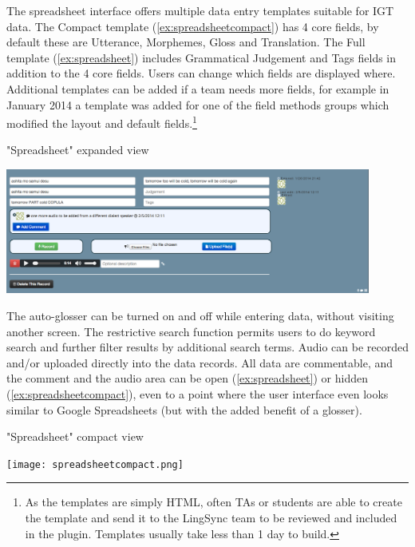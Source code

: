 \documentclass[letterpaper, 12pt, dvips]{mitwpl}
\begin{document}
 The spreadsheet interface offers multiple data entry templates suitable for IGT data. The Compact template (\ref{ex:spreadsheetcompact}) has 4 core fields, by default these are Utterance, Morphemes, Gloss and Translation. The Full template  (\ref{ex:spreadsheet}) includes Grammatical Judgement and Tags fields in addition to the 4 core fields. Users can change which fields are displayed where. Additional templates can be added if a team needs more fields, for example in January 2014 a template was added for one of the field methods groups which modified the layout and default fields.\footnote{As the templates are simply HTML, often TAs or students are able to create the template and send it to the LingSync team to be reviewed and included in the plugin. Templates usually take less than 1 day to build.} 
 
 
\begin{exe} 
\ex "Spreadsheet" expanded view\\

  \begin{center}
   \includegraphics[width=0.9\textwidth]{spreadsheetinterface.png}
   \end{center}

\label{ex:spreadsheet}
\end{exe} 

The auto-glosser can be turned on and off while entering data, without visiting another screen.  The restrictive search function permits users to do keyword search and further filter results by additional search terms. Audio can be recorded and/or  uploaded directly into the data records. All data are commentable, and the comment and the audio area can be  open  (\ref{ex:spreadsheet}) or hidden  (\ref{ex:spreadsheetcompact}), even to a point where the user interface even looks similar to Google Spreadsheets (but with the added benefit of a glosser). 

\begin{exe} 
\ex "Spreadsheet" compact view \\

 \begin{center}
   \texttt{[image: spreadsheetcompact.png]}
 \end{center}
 
\label{ex:spreadsheetcompact}
\end{exe} 
\end{document}
